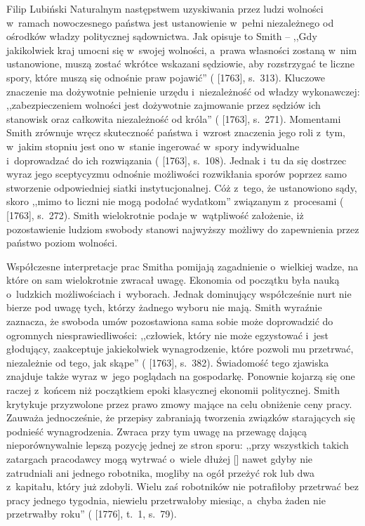 \begin{artplenv}{Filip Lubiński}
Naturalnym następstwem uzyskiwania przez ludzi wolności w~ramach nowoczesnego państwa jest ustanowienie w~pełni
niezależnego od ośrodków władzy politycznej sądownictwa. Jak opisuje to Smith -- ,,Gdy jakikolwiek kraj umocni
się w~swojej wolności, a~prawa własności zostaną w~nim ustanowione, muszą zostać wkrótce wskazani sędziowie, aby rozstrzygać
te liczne spory, które muszą się odnośnie praw pojawić''
(\cite{smith_lectures_1982} [1763], s.~313).
Kluczowe
znaczenie ma dożywotnie pełnienie urzędu i~niezależność od władzy wykonawczej: ,,zabezpieczeniem wolności jest
dożywotnie zajmowanie przez sędziów ich stanowisk oraz całkowita niezależność od króla''
(\cite{smith_lectures_1982} [1763], s.~271).
Momentami Smith zrównuje wręcz skuteczność państwa i~wzrost
znaczenia jego roli z~tym, w~jakim stopniu jest ono w~stanie ingerować w~spory indywidualne i~doprowadzać do ich
rozwiązania
(\cite{smith_lectures_1982} [1763], s.~108).
Jednak i~tu da się dostrzec wyraz jego sceptycyzmu
odnośnie możliwości rozwikłania sporów poprzez samo stworzenie odpowiedniej siatki instytucjonalnej. Cóż z~tego, że
ustanowiono sądy, skoro ,,mimo to liczni nie mogą podołać wydatkom'' związanym z~procesami
(\cite{smith_lectures_1982} [1763], s.~272).
Smith wielokrotnie podaje w~wątpliwość założenie, iż
pozostawienie ludziom swobody stanowi najwyższy możliwy do zapewnienia przez państwo poziom wolności.

Współczesne interpretacje prac Smitha pomijają zagadnienie o~wielkiej wadze, na które on sam wielokrotnie zwracał
uwagę. Ekonomia od początku była nauką o~ludzkich możliwościach i~wyborach. Jednak dominujący współcześnie nurt nie
bierze pod uwagę tych, którzy żadnego wyboru nie mają. Smith wyraźnie zaznacza, że swoboda umów pozostawiona sama sobie
może doprowadzić do ogromnych niesprawiedliwości: ,,człowiek, który nie może egzystować i~jest głodujący, zaakceptuje
jakiekolwiek wynagrodzenie, które pozwoli mu przetrwać, niezależnie od tego, jak skąpe''
(\cite{smith_lectures_1982} [1763], s.~382).
Świadomość tego zjawiska znajduje także wyraz w~jego poglądach na gospodarkę. Ponownie kojarzą
się one raczej z~końcem niż początkiem epoki klasycznej ekonomii politycznej. Smith krytykuje przyzwolone przez prawo
zmowy mające na celu obniżenie ceny pracy. Zauważa jednocześnie, że przepisy zabraniają tworzenia związków starających
się podnieść wynagrodzenia. Zwraca przy tym uwagę na przewagę dającą nieporównywalnie lepszą pozycję jednej ze stron
sporu: ,,przy wszystkich takich zatargach pracodawcy mogą wytrwać o~wiele dłużej [\mydots] nawet gdyby nie zatrudniali ani
jednego robotnika, mogliby na ogół przeżyć rok lub dwa z~kapitału, który już zdobyli. Wielu zaś robotników nie
potrafiłoby przetrwać bez pracy jednego tygodnia, niewielu przetrwałoby miesiąc, a~chyba żaden nie przetrwałby roku''
(\cite{smith_badania_2007} [1776], t.~1, s.~79).


\end{artplenv}
